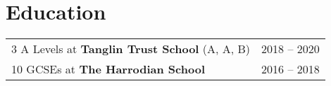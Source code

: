 \documentclass[a4paper,12pt]{article}
\begin{document}
\section{Education}
\begin{tabularx}{\linewidth}{@{}l X@{}}

    3 A Levels at \textbf{Tanglin Trust School} (A, A, B) & \hfill 2018 -- 2020 \\
    10 GCSEs at \textbf{The Harrodian School}             & \hfill 2016 -- 2018 \\
\end{tabularx}

\end{document}
